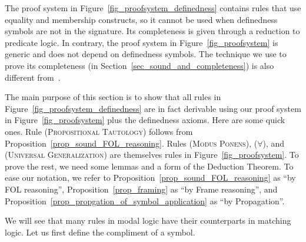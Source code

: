\documentclass[acmsmall]{acmart}
\theoremstyle{acmdefinition}
\newcommand{\prule}[1]{\textsc{(#1)}}
\newcommand{\modusponens}{\prule{Modus Ponens}\xspace}
\newcommand{\universalgeneralization}{\prule{Universal Generalization}\xspace}
\newcommand{\propositionaltautology}{\prule{Propositional Tautology}\xspace}
\newcommand{\forallrule}{\prule{$\forall$}\xspace}
\newcommand{\eframing}{Frame reasoning\xspace}
\newcommand{\epropagation}{Propagation\xspace}
\DeclarePairedDelimiter{\ceil}{\lceil}{\rceil}
\newcommand{\vdashd}{\vdash_d}
\newcommand{\Figure}[1]{Figure~\ref{#1}}
\begin{document}
\begin{comment}
We denote the provability relation of 
this proof system with definedness symbols as ``$\vdashd$''
to distinguish it from the one that we defined in 
Definition~\ref{def_proof}.
Formally, we have the next definition.

\begin{definition}
	\label{def_proofd}
	Let $\Gamma$ be a set of patterns containing all instances of the
	axiom schema $\forall x . \ceil{x}$ for definedness symbols.
	
	The set of all theorems deduced from $\Gamma$ is defined as
	the smallest set that contains $\Gamma$
	and is closed under the proof rules of the proof system.
	If $\varphi$ is in the set of all theorems deduced from $\Gamma$,
	we write $\Gamma \vdash \varphi$
	and say $\varphi$ is a theorem of $\Gamma$.
	When $\Gamma$ is the empty set, 
	we abbreviate $\emptyset \vdash \varphi$ as just
	$\vdash \varphi$.
\end{definition}
\end{comment}

The proof system in Figure~\ref{fig_proofsystem_definedness}
contains rules that use equality and membership constructs,
so it cannot be used when definedness symbols are not
in the signature.
Its completeness is given through a reduction to predicate logic.
In contrary, the proof system in \Figure{fig_proofsystem}
is generic and does not depend on definedness symbols.
The technique we use to prove its completeness
(in Section~\ref{sec_sound_and_completeness})
is also different from~\cite{rosu-2017-lmcs}.

The main purpose of this section is to show that
all rules in Figure~\ref{fig_proofsystem_definedness}
are in fact derivable using our proof system
in Figure~\ref{fig_proofsystem} plus the definedness axioms.
Here are some quick ones.
Rule \propositionaltautology follows from
Proposition~\ref{prop_sound_FOL_reasoning}.
Rules \modusponens, \forallrule, and \universalgeneralization
are themselves rules in Figure~\ref{fig_proofsystem}.
To prove the rest,
we need some lemmas and a form of the Deduction Theorem.
To ease our notation, we refer to
Proposition~\ref{prop_sound_FOL_reasoning} as ``by FOL reasoning'',
Proposition~\ref{prop_framing} as ``by \eframing'',
and
Proposition~\ref{prop_propgation_of_symbol_application} as
``by \epropagation''.

We will see that many rules in modal logic have their
counterparts in matching logic.
Let us first define the compliment of a symbol.
\end{document}
